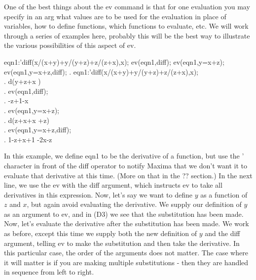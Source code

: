 One of the best things about the ev command is that for one evaluation
you may specify in an arg what values are to be used for the evaluation
in place of variables, how to define functions, which functions to
evaluate, etc. We will work through a series of examples here, probably
this will be the best way to illustrate the various possibilities
of this aspect of ev.

\vspace{3ex}

\beginmaximasession
eqn1:'diff(x/(x+y)+y/(y+z)+z/(z+x),x);
ev(eqn1,diff);
ev(eqn1,y=x+z);
ev(eqn1,y=x+z,diff);
\maximatexsession
{}.  eqn1:'diff(x/(x+y)+y/(y+z)+z/(z+x),x); \\
.   {{d}}\*\left({{y}}+{{z}}+{{x
 }}\right) \\
.  ev(eqn1,diff); \\
.   -{{z}}+{{1}}-{{x}} \\
.  ev(eqn1,y=x+z); \\
.   {{d}}\*\left({{z+x}}+{{x}}
 +{{z}}\right) \\
.  ev(eqn1,y=x+z,diff); \\
.   {{1}}-{{z+x}}+{{1
 }}-{{2\*x}}-{{z}} \\
\endmaximasession

\vspace{3ex}

In this example, we define eqn1 to be the derivative of a function,
but use the ' character in front of the diff operator to notify Maxima
that we don't want it to evaluate that derivative at this time. (More
on that in the ?? section.) In the next line, we use the ev with the
diff argument, which instructs ev to take all derivatives in this
expression. Now, let's say we want to define \( y \) as a function
of \( z \) and \( x \), but again avoid evaluating the derivative.
We supply our definition of \( y \) as an argument to ev, and in
(D3) we see that the substitution has been made. Now, let's evaluate
the derivative after the substitution has been made. We work as before,
except this time we supply both the new definition of \( y \) and
the diff argument, telling ev to make the substitution and then take
the derivative. In this particular case, the order of the arguments
does not matter. The case where it will matter is if you are making
multiple substitutions - then they are handled in sequence from left
to right. 

